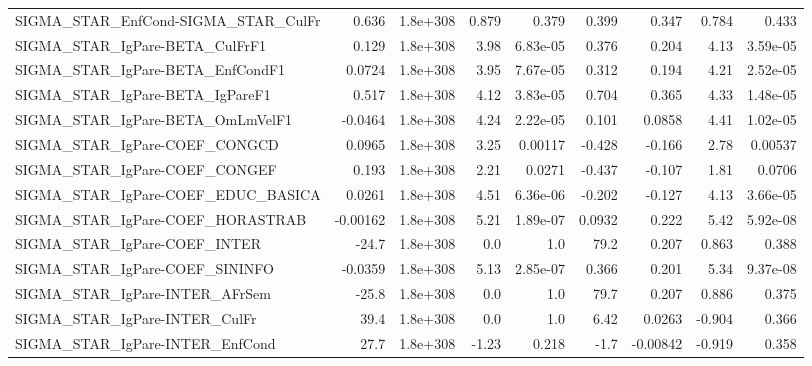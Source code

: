 \begin{tabular}{lrrrrrrrr}
SIGMA\_STAR\_EnfCond-SIGMA\_STAR\_CulFr   &       0.636 &     1.8e+308 &   0.879 &    0.379 &      0.399 &       0.347 &        0.784 &         0.433 \\
SIGMA\_STAR\_IgPare-BETA\_CulFrF1        &       0.129 &     1.8e+308 &    3.98 & 6.83e-05 &      0.376 &       0.204 &         4.13 &      3.59e-05 \\
SIGMA\_STAR\_IgPare-BETA\_EnfCondF1      &      0.0724 &     1.8e+308 &    3.95 & 7.67e-05 &      0.312 &       0.194 &         4.21 &      2.52e-05 \\
SIGMA\_STAR\_IgPare-BETA\_IgPareF1       &       0.517 &     1.8e+308 &    4.12 & 3.83e-05 &      0.704 &       0.365 &         4.33 &      1.48e-05 \\
SIGMA\_STAR\_IgPare-BETA\_OmLmVelF1      &     -0.0464 &     1.8e+308 &    4.24 & 2.22e-05 &      0.101 &      0.0858 &         4.41 &      1.02e-05 \\
SIGMA\_STAR\_IgPare-COEF\_CONGCD         &      0.0965 &     1.8e+308 &    3.25 &  0.00117 &     -0.428 &      -0.166 &         2.78 &       0.00537 \\
SIGMA\_STAR\_IgPare-COEF\_CONGEF         &       0.193 &     1.8e+308 &    2.21 &   0.0271 &     -0.437 &      -0.107 &         1.81 &        0.0706 \\
SIGMA\_STAR\_IgPare-COEF\_EDUC\_BASICA    &      0.0261 &     1.8e+308 &    4.51 & 6.36e-06 &     -0.202 &      -0.127 &         4.13 &      3.66e-05 \\
SIGMA\_STAR\_IgPare-COEF\_HORASTRAB      &    -0.00162 &     1.8e+308 &    5.21 & 1.89e-07 &     0.0932 &       0.222 &         5.42 &      5.92e-08 \\
SIGMA\_STAR\_IgPare-COEF\_INTER          &       -24.7 &     1.8e+308 &     0.0 &      1.0 &       79.2 &       0.207 &        0.863 &         0.388 \\
SIGMA\_STAR\_IgPare-COEF\_SININFO        &     -0.0359 &     1.8e+308 &    5.13 & 2.85e-07 &      0.366 &       0.201 &         5.34 &      9.37e-08 \\
SIGMA\_STAR\_IgPare-INTER\_AFrSem        &       -25.8 &     1.8e+308 &     0.0 &      1.0 &       79.7 &       0.207 &        0.886 &         0.375 \\
SIGMA\_STAR\_IgPare-INTER\_CulFr         &        39.4 &     1.8e+308 &     0.0 &      1.0 &       6.42 &      0.0263 &       -0.904 &         0.366 \\
SIGMA\_STAR\_IgPare-INTER\_EnfCond       &        27.7 &     1.8e+308 &   -1.23 &    0.218 &       -1.7 &    -0.00842 &       -0.919 &         0.358 \\

\end{tabular}
